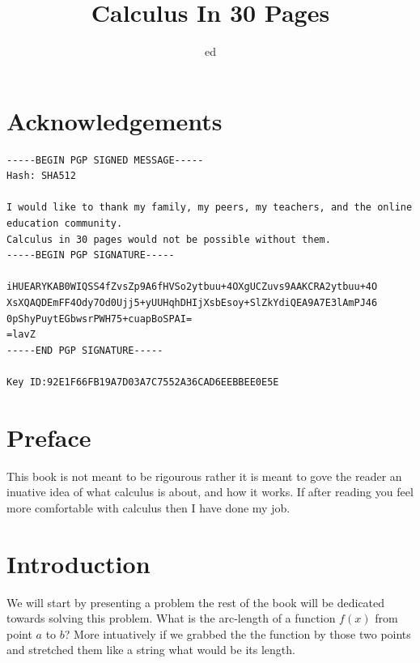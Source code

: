 \documentclass[12pt]{book}
\title{Calculus In 30 Pages}
\author{ed}
\date{}
\begin{document}
\frontmatter
\maketitle

\mainmatter
\chapter*{Acknowledgements}

\small
\begin{verbatim}
-----BEGIN PGP SIGNED MESSAGE-----
Hash: SHA512

I would like to thank my family, my peers, my teachers, and the online education community.
Calculus in 30 pages would not be possible without them.
-----BEGIN PGP SIGNATURE-----

iHUEARYKAB0WIQSS4fZvsZp9A6fHVSo2ytbuu+4OXgUCZuvs9AAKCRA2ytbuu+4O
XsXQAQDEmFF4Ody7Od0Ujj5+yUUHqhDHIjXsbEsoy+SlZkYdiQEA9A7E3lAmPJ46
0pShyPuytEGbwsrPWH75+cuapBoSPAI=
=lavZ
-----END PGP SIGNATURE-----

Key ID:92E1F66FB19A7D03A7C7552A36CAD6EEBBEE0E5E
\end{verbatim}
\normalsize

\tableofcontents
\chapter*{Preface}
This book is not meant to be rigourous rather it is meant to gove the reader an inuative idea of what calculus is about, and how it works. If after reading you feel more comfortable with calculus then I have done my job.

\chapter{Introduction}

\newcommand{\OurFunc}{\frac{4}{3}x^{\frac{3}{2}}}
We will start by presenting a problem the rest of the book will be dedicated towards solving this problem.
What is the arc-length of a function $f(x)$ from point $a$ to $b$? More intuatively if we grabbed the the function by those two points and stretched them like a string what would be its length.
\end{document}
